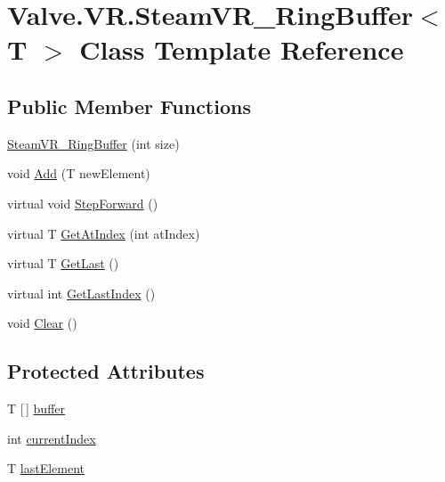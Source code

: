 \hypertarget{class_valve_1_1_v_r_1_1_steam_v_r___ring_buffer}{}\section{Valve.\+V\+R.\+Steam\+V\+R\+\_\+\+Ring\+Buffer$<$ T $>$ Class Template Reference}
\label{class_valve_1_1_v_r_1_1_steam_v_r___ring_buffer}
\subsection*{Public Member Functions}
\begin{DoxyCompactItemize}
\item 
\mbox{\hyperlink{class_valve_1_1_v_r_1_1_steam_v_r___ring_buffer_a36e59d7a9b85e2b7cc839d75c5ad61e9}{Steam\+V\+R\+\_\+\+Ring\+Buffer}} (int size)
\item 
void \mbox{\hyperlink{class_valve_1_1_v_r_1_1_steam_v_r___ring_buffer_a1bf14d3db2297247dc729f929f085f4d}{Add}} (T new\+Element)
\item 
virtual void \mbox{\hyperlink{class_valve_1_1_v_r_1_1_steam_v_r___ring_buffer_a28bb53437d7a8a6071c2f142b336a699}{Step\+Forward}} ()
\item 
virtual T \mbox{\hyperlink{class_valve_1_1_v_r_1_1_steam_v_r___ring_buffer_acd9c1718d7b0ac46450f9ddd66706e9a}{Get\+At\+Index}} (int at\+Index)
\item 
virtual T \mbox{\hyperlink{class_valve_1_1_v_r_1_1_steam_v_r___ring_buffer_ad9db913b6565e1c3cbeaccdd7b545b87}{Get\+Last}} ()
\item 
virtual int \mbox{\hyperlink{class_valve_1_1_v_r_1_1_steam_v_r___ring_buffer_a33fbb3e137538cd6ff1731d4df99691a}{Get\+Last\+Index}} ()
\item 
void \mbox{\hyperlink{class_valve_1_1_v_r_1_1_steam_v_r___ring_buffer_a2ac31def831b99ea7d22dba6bea81a74}{Clear}} ()
\end{DoxyCompactItemize}
\subsection*{Protected Attributes}
\begin{DoxyCompactItemize}
\item 
T \mbox{[}$\,$\mbox{]} \mbox{\hyperlink{class_valve_1_1_v_r_1_1_steam_v_r___ring_buffer_ac33dcde97828b5aa7f8edba621616db6}{buffer}}
\item 
int \mbox{\hyperlink{class_valve_1_1_v_r_1_1_steam_v_r___ring_buffer_aa8b9134d2a812fe24fdb72e9872d3ebd}{current\+Index}}
\item 
T \mbox{\hyperlink{class_valve_1_1_v_r_1_1_steam_v_r___ring_buffer_ae354c0aafc31dc30bad9c4663a605cd6}{last\+Element}}
\end{DoxyCompactItemize}


